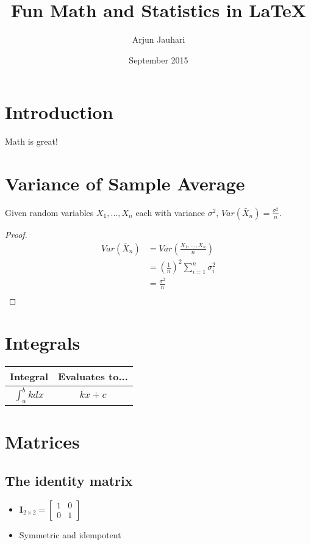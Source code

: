 \documentclass{article}
\title{Fun Math and Statistics in \LaTeX}
\author{Arjun Jauhari}
\date{September 2015}
\begin{document}
\maketitle

\section*{Introduction}

Math is great!

\section{Variance of Sample Average}
Given random variables $X_1, ..., X_n$  each with variance $\sigma^2$, $Var(\bar{X}_n) = \frac{\sigma^2}{n}$.

\begin{proof}
\begin{equation*}
\begin{split}
Var(\bar{X}_n) &= Var\left(\frac{X_1, ..., X_n}{n}\right) \\
&= (\frac{1}{n})^2 \sum_{i=1}^{n} \sigma_i^2 \\
&= \frac{\sigma^2}{n} \\
\end{split}
\end{equation*}
\end{proof}

\section{Integrals}
\begin{center}
\setlength{\tabcolsep}{1cm}
\def\arraystretch{2.5}
\begin{tabular}{c|c}
Integral & Evaluates to... \\
\hline
$\displaystyle \int_{a}^{b} k dx$ & $kx+c$
\end{tabular}
\end{center}

\section{Matrices}
\subsection{ The identity matrix}
\begin{itemize}
\item $ \mathbf{I}_{2 \times 2} = \left[
    \begin{array}{cc}
     1 & 0 \\
     0 & 1
    \end{array} \right] $
\item Symmetric and idempotent
\end{itemize}
\end{document}
